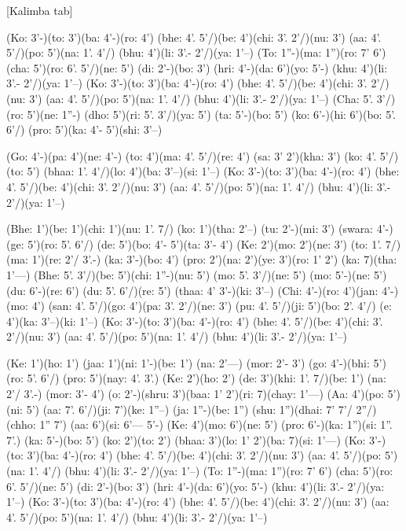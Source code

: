 \documentclass[11pt]{article}
\begin{document}
[Kalimba tab]
\begin{jianpu}
(Ko: 3'-)(to: 3')(ba: 4'-)(ro: 4') (bhe: 4'. 5'/)(be: 4')(chi: 3'. 2'/)(nu: 3')
(aa: 4'. 5'/)(po: 5')(na: 1'. 4'/) (bhu: 4')(li: 3'.- 2'/)(ya: 1'--)
(To: 1''-)(ma: 1'')(ro: 7' 6') (cha: 5')(ro: 6'. 5'/)(ne: 5') (di: 2'-)(bo: 3')
(hri: 4'-)(da: 6')(yo: 5'-) (khu: 4')(li: 3'.- 2'/)(ya: 1'--)
(Ko: 3'-)(to: 3')(ba: 4'-)(ro: 4') (bhe: 4'. 5'/)(be: 4')(chi: 3'. 2'/)(nu: 3')
(aa: 4'. 5'/)(po: 5')(na: 1'. 4'/) (bhu: 4')(li: 3'.- 2'/)(ya: 1'--)
(Cha: 5'. 3'/)(ro: 5')(ne: 1''-) (dho: 5')(ri: 5'. 3'/)(ya: 5')
(ta: 5'-)(bo: 5') (ko: 6'-)(hi: 6')(bo: 5'. 6'/) (pro: 5')(ka: 4'- 5')(shi: 3'--)

(Go: 4'-)(pa: 4')(ne: 4'-) (to: 4')(ma: 4'. 5'/)(re: 4')
(sa: 3' 2')(kha: 3') (ko: 4'. 5'/)(to: 5') (bhaa: 1'. 4'/)(lo: 4')(ba: 3'--)(si: 1'--)
(Ko: 3'-)(to: 3')(ba: 4'-)(ro: 4') (bhe: 4'. 5'/)(be: 4')(chi: 3'. 2'/)(nu: 3')
(aa: 4'. 5'/)(po: 5')(na: 1'. 4'/) (bhu: 4')(li: 3'.- 2'/)(ya: 1'--)

(Bhe: 1')(be: 1')(chi: 1')(nu: 1'. 7/) (ko: 1')(tha: 2'--)
(tu: 2'-)(mi: 3') (swara: 4'-)(ge: 5')(ro: 5'. 6'/) (de: 5')(bo: 4'- 5')(ta: 3'- 4')
(Ke: 2')(mo: 2')(ne: 3') (to: 1'. 7/)(ma: 1')(re: 2'/ 3'.-)
(ka: 3'-)(bo: 4') (pro: 2')(na: 2')(ye: 3')(ro: 1' 2') (ka: 7)(tha: 1'---)
(Bhe: 5'. 3'/)(be: 5')(chi: 1''-)(nu: 5') (mo: 5'. 3'/)(ne: 5') (mo: 5'-)(ne: 5')
(du: 6'-)(re: 6') (du: 5'. 6'/)(re: 5') (thaa: 4' 3'-)(ki: 3'--)
(Chi: 4'-)(ro: 4')(jan: 4'-)(mo: 4') (san: 4'. 5'/)(go: 4')(pa: 3'. 2'/)(ne: 3')
(pu: 4'. 5'/)(ji: 5')(bo: 2'. 4'/) (e: 4')(ka: 3'--)(ki: 1'--)
(Ko: 3'-)(to: 3')(ba: 4'-)(ro: 4') (bhe: 4'. 5'/)(be: 4')(chi: 3'. 2'/)(nu: 3')
(aa: 4'. 5'/)(po: 5')(na: 1'. 4'/) (bhu: 4')(li: 3'.- 2'/)(ya: 1'--)

(Ke: 1')(ho: 1') (jaa: 1')(ni: 1'-)(be: 1') (na: 2'---)
(mor: 2'- 3') (go: 4'-)(bhi: 5')(ro: 5'. 6'/) (pro: 5')(nay: 4'. 3'.)
(Ke: 2')(ho: 2') (de: 3')(khi: 1'. 7/)(be: 1') (na: 2'/ 3'.-)
(mor: 3'- 4') (o: 2'-)(shru: 3')(baa: 1' 2')(ri: 7)(chay: 1'---)
(Aa: 4')(po: 5')(ni: 5') (aa: 7'. 6'/)(ji: 7')(ke: 1''--)
(ja: 1''-)(be: 1'') (shu: 1'')(dhai: 7' 7'/ 2''/)(chho: 1'' 7') (aa: 6')(si: 6'--- 5'-)
(Ke: 4')(mo: 6')(ne: 5') (pro: 6'-)(ka: 1'')(si: 1''. 7'.) (ka: 5'-)(bo: 5')
(ko: 2')(to: 2') (bhaa: 3')(lo: 1' 2')(ba: 7)(si: 1'---)
(Ko: 3'-)(to: 3')(ba: 4'-)(ro: 4') (bhe: 4'. 5'/)(be: 4')(chi: 3'. 2'/)(nu: 3')
(aa: 4'. 5'/)(po: 5')(na: 1'. 4'/) (bhu: 4')(li: 3'.- 2'/)(ya: 1'--)
(To: 1''-)(ma: 1'')(ro: 7' 6') (cha: 5')(ro: 6'. 5'/)(ne: 5') (di: 2'-)(bo: 3')
(hri: 4'-)(da: 6')(yo: 5'-) (khu: 4')(li: 3'.- 2'/)(ya: 1'--)
(Ko: 3'-)(to: 3')(ba: 4'-)(ro: 4') (bhe: 4'. 5'/)(be: 4')(chi: 3'. 2'/)(nu: 3')
(aa: 4'. 5'/)(po: 5')(na: 1'. 4'/) (bhu: 4')(li: 3'.- 2'/)(ya: 1'--)
\end{jianpu}
\end{document}
